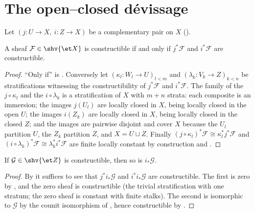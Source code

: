 \section{The open--closed d\'evissage}\label{sec:constructible-devissage}

Let $(j\colon U\to X,\ i\colon Z\to X)$ be a complementary pair on $X$
().

\begin{proposition}
\label{prop:constructible-open-closed}
\leanok
A sheaf $\mathcal F\in\shv{\et X}$ is constructible if and only if
$j^*\mathcal F$ and $i^*\mathcal F$ are constructible.
\end{proposition}
\begin{proof}
\leanok
``Only if'' is .  Conversely let
$(\kappa_l\colon W_l\to U)_{l<m}$ and $(\lambda_k\colon V_k\to Z)_{k<n}$ be
stratifications witnessing the constructibility of $j^*\mathcal F$ and
$i^*\mathcal F$.  The family of the $j\circ\kappa_l$ and the
$i\circ\lambda_k$ is a stratification of $X$ with $m+n$ strata: each
composite is an immersion; the images $j(U_l)$ are locally closed in $X$,
being locally closed in the open $U$; the images $i(Z_k)$ are locally
closed in $X$, being locally closed in the closed $Z$; and the images are
pairwise disjoint and cover $X$ because the $U_l$ partition $U$, the $Z_k$
partition $Z$, and $X=U\sqcup Z$.  Finally
$(j\circ\kappa_l)^*\mathcal F\cong\kappa_l^*j^*\mathcal F$ and
$(i\circ\lambda_k)^*\mathcal F\cong\lambda_k^*i^*\mathcal F$ are finite
locally constant by construction and .
\end{proof}

\begin{lemma}
\label{lemma:constructible-lowerStar-closed}
\leanok
If $\mathcal G\in\shv{\et Z}$ is constructible, then so is
$i_*\mathcal G$.
\end{lemma}
\begin{proof}
\leanok
By  it suffices to see that
$j^*i_*\mathcal G$ and $i^*i_*\mathcal G$ are constructible.  The first is
zero by , and the zero sheaf is
constructible (the trivial stratification with one stratum; the zero sheaf
is constant with finite stalks).  The second is isomorphic to $\mathcal G$
by the counit isomorphism of
, hence constructible by
.
\end{proof}

